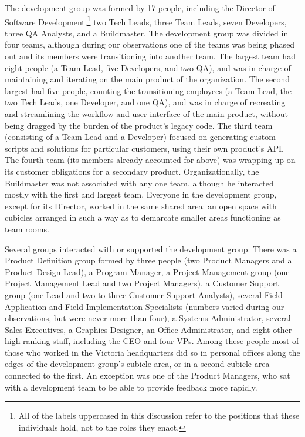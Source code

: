 \documentclass[10pt, conference, compsocconf]{IEEEtran}
\begin{document}
The development group was formed by 17 people, including the Director of Software Development,\footnote{All of the labels uppercased in this discussion refer to the positions that these individuals hold, not to the roles they enact.} two Tech Leads, three Team Leads, seven Developers, three QA Analysts, and a Buildmaster. The development group was divided in four teams, although during our observations one of the teams was being phased out and its members were transitioning into another team. The largest team had eight people (a Team Lead, five Developers, and two QA), and was in charge of maintaining and iterating on the main product of the organization. The second largest had five people, counting the transitioning employees (a Team Lead, the two Tech Leads, one Developer, and one QA), and was in charge of recreating and streamlining the workflow and user interface of the main product, without being dragged by the burden of the product's legacy code. The third team (consisting of a Team Lead and a Developer) focused on generating custom scripts and solutions for particular customers, using their own product's API. The fourth team (its members already accounted for above) was wrapping up on its customer obligations for a secondary product. Organizationally, the Buildmaster was not associated with any one team, although he interacted mostly with the first and largest team. Everyone in the development group, except for its Director, worked in the same shared area: an open space with cubicles arranged in such a way as to demarcate smaller areas functioning as team rooms.

Several groups interacted with or supported the development group. There was a Product Definition group formed by three people (two Product Managers and a Product Design Lead), a Program Manager, a Project Management group (one Project Management Lead and two Project Managers), a Customer Support group (one Lead and two to three Customer Support Analysts), several Field Application and Field Implementation Specialists (numbers varied during our observations, but were never more than four), a Systems Administrator, several Sales Executives, a Graphics Designer, an Office Administrator, and eight other high-ranking staff, including the CEO and four VPs. Among these people most of those who worked in the Victoria headquarters did so in personal offices along the edges of the development group's cubicle area, or in a second cubicle area connected to the first. An exception was one of the Product Managers, who sat with a development team to be able to provide feedback more rapidly.
\end{document}
